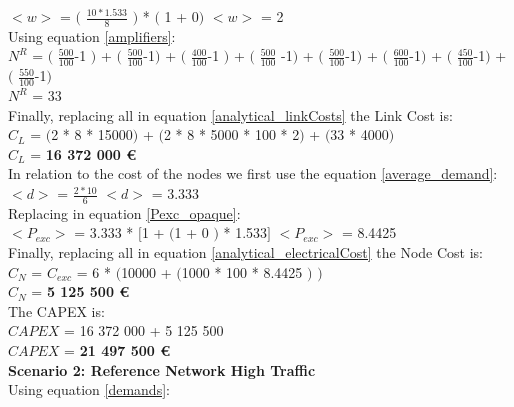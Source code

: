 $<w>$ = $($ $\frac{10 * 1.533}{8}$ $)$ * $($ 1 + 0$)$ \qquad \qquad $<w>$ = 2\\

Using equation \ref{amplifiers}:\\

$N^R$ = $($ $\frac{500}{100}$-1 $)$ + $($ $\frac{500}{100}$-1$)$ + $($ $\frac{400}{100}$-1 $)$ + $($ $\frac{500}{100}$ -1$)$ + $($ $\frac{500}{100}$-1$)$ + $($ $\frac{600}{100}$-1$)$ + $($ $\frac{450}{100}$-1$)$ + $($ $\frac{550}{100}$-1$)$\\

$N^R$ = 33\\

Finally, replacing all in equation \ref{analytical_linkCosts} the Link Cost is:\\

$C_L$ = $($2 * 8 * 15000$)$ + $($2 * 8 * 5000 * 100 * 2$)$ + $($33 * 4000$)$\\

$C_L$ = \textbf{16 372 000 \euro}\\

In relation to the cost of the nodes we first use the equation \ref{average_demand}:\\

$<d>$ = $\frac{2 * 10}{6}$ \qquad \qquad $<d>$ = 3.333\\

Replacing in equation \ref{Pexc_opaque}:\\

$<P_{exc}>$ = 3.333 * $[$1 + $($1 + $0$ $)$ * 1.533$]$ \qquad \quad $<P_{exc}>$ = 8.4425 \\

Finally, replacing all in equation \ref{analytical_electricalCost} the Node Cost is:\\

$C_N$ = $C_{exc}$ = 6 * $($10000 + $($1000 * 100 * 8.4425 $)$ $)$\\

$C_N$ = \textbf{5 125 500 \euro}\\

The CAPEX is:\\
$CAPEX$ = 16 372 000 + 5 125 500\\

$CAPEX$ = \textbf{21 497 500 \euro}\\

\textbf{Scenario 2: Reference Network High Traffic}\\

Using equation \ref{demands}:\\


